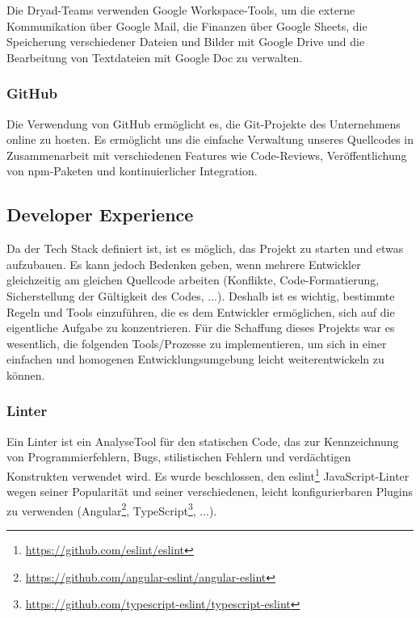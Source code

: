 Die Dryad-Teams verwenden Google Workspace-Tools, um die externe Kommunikation über Google Mail, die Finanzen über Google Sheets, die Speicherung verschiedener Dateien und Bilder mit Google Drive und die Bearbeitung von Textdateien mit Google Doc zu verwalten.

\subsubsection{GitHub}

Die Verwendung von GitHub ermöglicht es, die Git-Projekte des Unternehmens online zu hosten.
Es ermöglicht uns die einfache Verwaltung unseres Quellcodes in Zusammenarbeit mit verschiedenen Features wie Code-Reviews, Veröffentlichung von npm-Paketen und kontinuierlicher Integration.

\subsection{Developer Experience}
Da der Tech Stack definiert ist, ist es möglich, das Projekt zu starten und etwas aufzubauen.
Es kann jedoch Bedenken geben, wenn mehrere Entwickler gleichzeitig am gleichen Quellcode arbeiten (Konflikte, Code-Formatierung, Sicherstellung der Gültigkeit des Codes, ...).
Deshalb ist es wichtig, bestimmte Regeln und Tools einzuführen, die es dem Entwickler ermöglichen, sich auf die eigentliche Aufgabe zu konzentrieren.
Für die Schaffung dieses Projekts war es wesentlich, die folgenden Tools/Prozesse zu implementieren, um sich in einer einfachen und homogenen Entwicklungsumgebung leicht weiterentwickeln zu können.

\subsubsection{Linter}
Ein Linter ist ein AnalyseTool für den statischen Code, das zur Kennzeichnung von Programmierfehlern, Bugs, stilistischen Fehlern und verdächtigen Konstrukten verwendet wird.
Es wurde beschlossen, den eslint\footnote{\href{https://github.com/eslint/eslint}{https://github.com/eslint/eslint}} JavaScript-Linter wegen seiner Popularität und seiner verschiedenen, leicht konfigurierbaren Plugins zu verwenden (Angular\footnote{\href{https://github.com/angular-eslint/angular-eslint}{https://github.com/angular-eslint/angular-eslint}}, TypeScript\footnote{\href{https://github.com/typescript-eslint/typescript-eslint}{https://github.com/typescript-eslint/typescript-eslint}}, ...).

